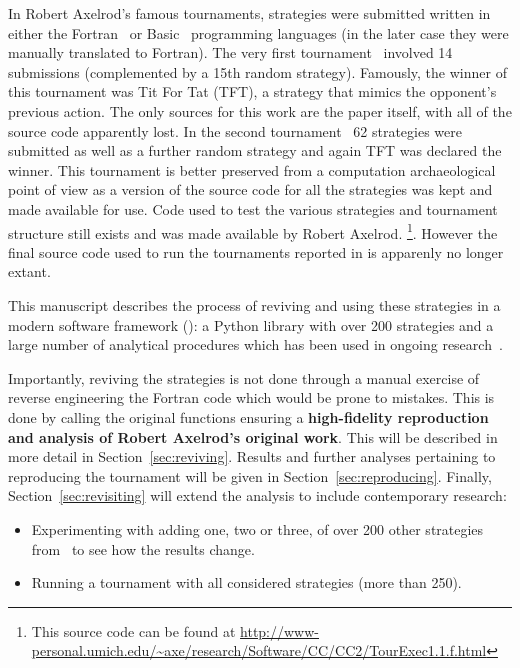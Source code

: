 \documentclass{article}
\begin{document}
In Robert Axelrod's famous tournaments, strategies were submitted written in either the
Fortran~\cite{smith1994programming} or Basic~\cite{Bishop2004}
programming languages (in the later case they were manually translated to Fortran).
The very first
tournament~\cite{Axelrod1980a} involved 14 submissions (complemented by a
15th random strategy). Famously, the winner of this tournament was Tit For
Tat (TFT), a strategy that mimics the opponent's previous action. The only sources
for this work are the paper itself, with all of the source code apparently lost.
In the second tournament~\cite{Axelrod1980b} 62 strategies were submitted as
well as a further random strategy and
again TFT was declared the winner. This tournament is better preserved from
a computation archaeological
point of view as a version of the source code for all the
strategies was kept and made available for use. Code used to test the various strategies
and tournament structure still exists and was made available by Robert Axelrod.
\footnote{This source code can be found at
\url{http://www-personal.umich.edu/~axe/research/Software/CC/CC2/TourExec1.1.f.html}}.
However the final source code used to run the tournaments reported in \cite{Axelrod1980b}
is apparenly no longer extant.

This manuscript describes the process of reviving and using these strategies in
a modern software framework (\cite{AxelrodProject}): a Python library with over
200 strategies and a large number of analytical procedures which has been used
in ongoing research~\cite{Harper2017, Knight2017, glynatsi2024properties,
bucciarelli2024studying, macmillan2024game}.

Importantly, reviving the strategies is not done
through a manual exercise of reverse engineering the Fortran code which would be
prone to mistakes. This is done by calling the original functions ensuring a
\textbf{high-fidelity reproduction and analysis of Robert Axelrod's original
work}. This will be described in more detail in Section~\ref{sec:reviving}.
Results and further analyses pertaining to reproducing the tournament will be
given in Section~\ref{sec:reproducing}. Finally, Section~\ref{sec:revisiting}
will extend the analysis to include contemporary research:

\begin{itemize}
    \item Experimenting with adding one, two or three, of over 200 other strategies
        from~\cite{AxelrodProject} to see how the results change.
    \item Running a tournament with all considered strategies (more than 250).
\end{itemize}
\end{document}
